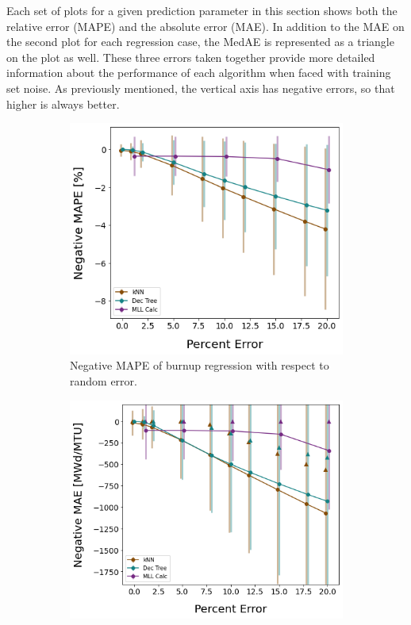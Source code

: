 Each set of plots for a given prediction parameter in this section shows both
the relative error (\gls{MAPE}) and the absolute error (\gls{MAE}). In addition
to the \gls{MAE} on the second plot for each regression case, the \gls{MedAE}
is represented as a triangle on the plot as well. These three errors taken
together provide more detailed information about the performance of each
algorithm when faced with training set noise.  As previously mentioned, the
vertical axis has negative errors, so that higher is always better.  

\begin{figure}[!htb]
  \centering
  \begin{subfigure}[b]{0.48\textwidth}
    \centering
    \includegraphics[width=\textwidth]{./chapters/exp1/randerr_compare_nuc29_MAPE_burn.png}
    \caption{Negative \gls{MAPE} of burnup regression with respect to 
             random error.}
    \label{fig:burnmape}
  \end{subfigure}
  \hfill
  \begin{subfigure}[b]{0.5\textwidth}
    \centering
    \includegraphics[width=\textwidth]{./chapters/exp1/randerr_compare_nuc29_MAE_burn.png}

\end{subfigure}
\end{figure}
